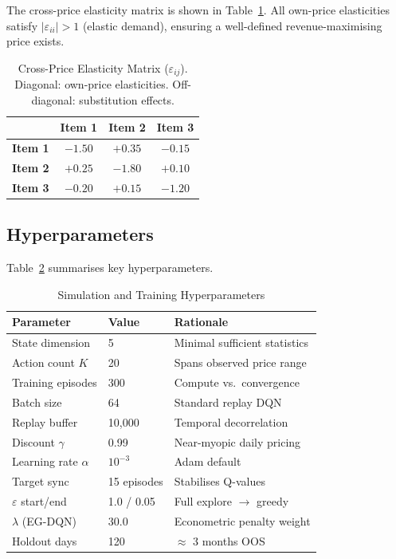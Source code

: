\documentclass[journal, 10pt, twoside]{IEEEtran}
\begin{document}
The cross-price elasticity matrix is shown in Table~\ref{tab:elasticity_matrix}.
All own-price elasticities satisfy $|\varepsilon_{ii}|>1$ (elastic demand),
ensuring a well-defined revenue-maximising price exists.

\begin{table}[H]
\centering
\caption{Cross-Price Elasticity Matrix ($\varepsilon_{ij}$).
Diagonal: own-price elasticities. Off-diagonal: substitution effects.}
\label{tab:elasticity_matrix}
\begin{tabular}{lccc}
\toprule
& \textbf{Item 1} & \textbf{Item 2} & \textbf{Item 3} \\
\midrule
\textbf{Item 1} & $-1.50$ & $+0.35$ & $-0.15$ \\
\textbf{Item 2} & $+0.25$ & $-1.80$ & $+0.10$ \\
\textbf{Item 3} & $-0.20$ & $+0.15$ & $-1.20$ \\
\bottomrule
\end{tabular}
\end{table}

\subsection{Hyperparameters}

Table~\ref{tab:hyperparams} summarises key hyperparameters.

\begin{table}[H]
\centering
\caption{Simulation and Training Hyperparameters}
\label{tab:hyperparams}
\begin{tabular}{lll}
\toprule
\textbf{Parameter} & \textbf{Value} & \textbf{Rationale}\\
\midrule
State dimension    & 5              & Minimal sufficient statistics\\
Action count $K$   & 20             & Spans observed price range\\
Training episodes  & 300            & Compute vs.\ convergence\\
Batch size         & 64             & Standard replay DQN\\
Replay buffer      & 10,000         & Temporal decorrelation\\
Discount $\gamma$  & 0.99           & Near-myopic daily pricing\\
Learning rate $\alpha$ & $10^{-3}$ & Adam default\\
Target sync        & 15 episodes    & Stabilises Q-values\\
$\varepsilon$ start/end & 1.0 / 0.05 & Full explore $\to$ greedy\\
$\lambda$ (EG-DQN) & 30.0           & Econometric penalty weight\\
Holdout days       & 120            & $\approx$ 3 months OOS\\
\bottomrule
\end{tabular}
\end{table}
\end{document}

